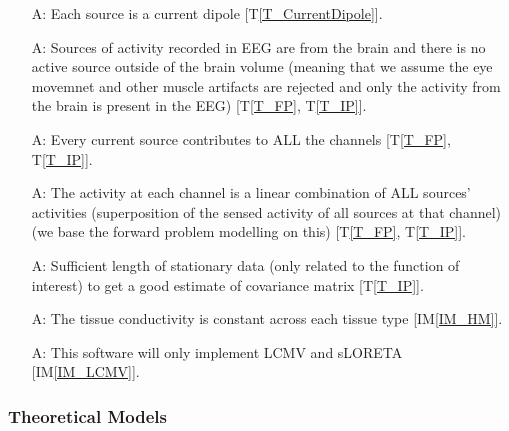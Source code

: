 \documentclass[12pt]{article}
\newcommand{\tref}[1]{T\ref{#1}}
\newcounter{assumpnum} %
\newcommand{\iref}[1]{IM\ref{#1}}
\begin{document}
\begin{itemize}

\item[A\refstepcounter{assumpnum}\theassumpnum \label{A_CD}:]
Each source is a current dipole [\tref{T_CurrentDipole}].
\item[A\refstepcounter{assumpnum}\theassumpnum \label{A_BrainOnly}:]
Sources of activity recorded in EEG are from the brain and there is no active source outside of the brain volume (meaning that we assume the eye movemnet and other muscle artifacts are rejected and only the activity from the brain is present in the EEG) [\tref{T_FP}, \tref{T_IP}].
\item[A\refstepcounter{assumpnum}\theassumpnum \label{A_AllChan}:]
Every current source contributes to ALL the channels [\tref{T_FP}, \tref{T_IP}].
\item[A\refstepcounter{assumpnum}\theassumpnum \label{A_SP}:] The activity at each channel is a linear combination of ALL sources' activities (superposition of the sensed activity of all sources at that channel) (we base the forward problem modelling on this)  [\tref{T_FP}, \tref{T_IP}].
\item[A\refstepcounter{assumpnum}\theassumpnum \label{A_SufData}:]Sufficient length of stationary data (only related to the function of interest) to get a good estimate of covariance matrix [\tref{T_IP}].
\item[A\refstepcounter{assumpnum}\theassumpnum \label{A_TC}:] The tissue conductivity is constant across each tissue type  [\iref{IM_HM}].
\item[A\refstepcounter{assumpnum}\theassumpnum \label{A_alg}:]  This software will only implement LCMV and sLORETA [\iref{IM_LCMV}].


\end{itemize}

\newpage
\subsubsection{Theoretical Models}\label{sec_theoretical}

\end{document}
